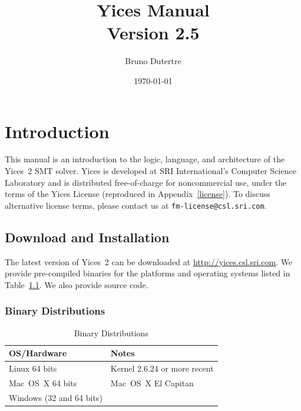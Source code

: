\documentclass[11pt,twoside,fleqn,openright,titlepage]{cslreport}
\begin{document}
\begin{titlepage}
\date{\today}
\author{Bruno Dutertre}
\title{\textbf{Yices Manual\\[0.6em]
Version 2.5}}
\end{titlepage}

\maketitle
\cleardoublepageblank
\tableofcontents
\cleardoublepage
\setcounter{page}{0}


\chapter{Introduction}

This  manual   is  an  introduction   to  the  logic,   language,  and
architecture  of the  Yices~2 SMT  solver. Yices  is developed  at SRI
International's  Computer   Science  Laboratory  and   is  distributed
free-of-charge for  noncommercial use,  under the  terms of  the Yices
License   (reproduced   in    Appendix~\ref{license}).    To   discuss
alternative     license     terms,     please    contact     us     at
\texttt{fm-license@csl.sri.com}.


\section{Download and Installation}

The    latest   version    of   Yices~2    can   be    downloaded   at
\url{http://yices.csl.sri.com}.  We  provide pre-compiled binaries for
the platforms and operating systems listed in Table~\ref{versions}. We
also provide source code.

\subsection{Binary Distributions}

\begin{table}
\begin{center}
\renewcommand{\arraystretch}{1.1}
\begin{tabular}{|l|l|}
\hline
\textbf{OS/Hardware} & \textbf{Notes} \\
\hline
\hline
Linux 64 bits & Kernel 2.6.24 or more recent \\
\hline
Mac~OS~X 64 bits &  Mac~OS~X El Capitan\\
\hline
Windows (32 and 64 bits) & \\
\hline
\end{tabular}
\end{center}
\caption{Binary Distributions}
\label{versions}
\end{table}
\end{document}
